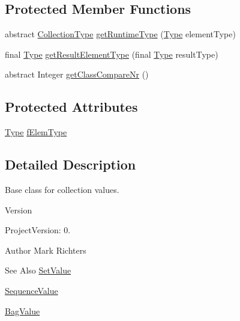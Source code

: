 \subsection*{Protected Member Functions}
\begin{DoxyCompactItemize}
\item 
abstract \hyperlink{classorg_1_1tzi_1_1use_1_1uml_1_1ocl_1_1type_1_1_collection_type}{Collection\-Type} \hyperlink{classorg_1_1tzi_1_1use_1_1uml_1_1ocl_1_1value_1_1_collection_value_a3f87754820dff2128f0e170e7c84b2d7}{get\-Runtime\-Type} (\hyperlink{interfaceorg_1_1tzi_1_1use_1_1uml_1_1ocl_1_1type_1_1_type}{Type} element\-Type)
\item 
final \hyperlink{interfaceorg_1_1tzi_1_1use_1_1uml_1_1ocl_1_1type_1_1_type}{Type} \hyperlink{classorg_1_1tzi_1_1use_1_1uml_1_1ocl_1_1value_1_1_collection_value_ab1d637504cede48d907afee5fe136996}{get\-Result\-Element\-Type} (final \hyperlink{interfaceorg_1_1tzi_1_1use_1_1uml_1_1ocl_1_1type_1_1_type}{Type} result\-Type)
\item 
abstract Integer \hyperlink{classorg_1_1tzi_1_1use_1_1uml_1_1ocl_1_1value_1_1_collection_value_a262fb51ebe20e55826e96f09f37704b9}{get\-Class\-Compare\-Nr} ()
\end{DoxyCompactItemize}
\subsection*{Protected Attributes}
\begin{DoxyCompactItemize}
\item 
\hyperlink{interfaceorg_1_1tzi_1_1use_1_1uml_1_1ocl_1_1type_1_1_type}{Type} \hyperlink{classorg_1_1tzi_1_1use_1_1uml_1_1ocl_1_1value_1_1_collection_value_a581086bafd3a86167b6215787e81eec2}{f\-Elem\-Type}
\end{DoxyCompactItemize}


\subsection{Detailed Description}
Base class for collection values.

\begin{DoxyVersion}{Version}

\end{DoxyVersion}
\begin{DoxyParagraph}{Project\-Version\-:}
0. 
\end{DoxyParagraph}
\begin{DoxyAuthor}{Author}
Mark Richters 
\end{DoxyAuthor}
\begin{DoxySeeAlso}{See Also}
\hyperlink{classorg_1_1tzi_1_1use_1_1uml_1_1ocl_1_1value_1_1_set_value}{Set\-Value} 

\hyperlink{classorg_1_1tzi_1_1use_1_1uml_1_1ocl_1_1value_1_1_sequence_value}{Sequence\-Value} 

\hyperlink{classorg_1_1tzi_1_1use_1_1uml_1_1ocl_1_1value_1_1_bag_value}{Bag\-Value} 
\end{DoxySeeAlso}


